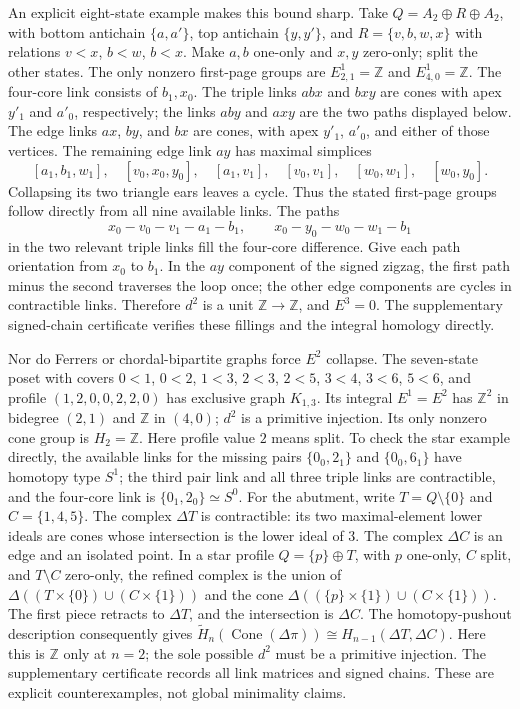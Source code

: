 \documentclass[11pt]{article}
\newcommand{\Cone}{\operatorname{Cone}}
\begin{document}
An explicit eight-state example makes this bound sharp.  Take
$Q=A_2\oplus R\oplus A_2$, with bottom antichain $\{a,a'\}$,
top antichain $\{y,y'\}$, and
$R=\{v,b,w,x\}$ with relations $v<x$, $b<w$, $b<x$.
Make $a,b$ one-only and $x,y$ zero-only; split the other states.
The only nonzero first-page groups are
$E^1_{2,1}=\mathbb Z$ and $E^1_{4,0}=\mathbb Z$.
The four-core link consists of $b_1,x_0$.  The triple links $abx$ and
$bxy$ are cones with apex $y'_1$ and $a'_0$, respectively; the links $aby$
and $axy$ are the two paths displayed below.  The edge links $ax$, $by$,
and $bx$ are cones, with apex $y'_1$, $a'_0$, and either of those vertices.
The remaining edge link $ay$ has maximal simplices
\[
 [a_1,b_1,w_1],\quad[v_0,x_0,y_0],\quad
 [a_1,v_1],\quad[v_0,v_1],\quad[w_0,w_1],\quad[w_0,y_0].
\]
Collapsing its two triangle ears leaves a cycle.  Thus the stated first-page
groups follow directly from all nine available links.  The paths
\[
 x_0-v_0-v_1-a_1-b_1,\qquad
 x_0-y_0-w_0-w_1-b_1
\]
in the two relevant triple links fill the four-core difference.
Give each path orientation from $x_0$ to $b_1$.  In the $ay$ component
of the signed zigzag, the first path minus the second traverses the loop once;
the other edge components are cycles in contractible links.  Therefore
$d^2$ is a unit $\mathbb Z\to\mathbb Z$, and $E^3=0$.
The supplementary signed-chain certificate verifies these fillings and
the integral homology directly.

Nor do Ferrers or chordal-bipartite graphs force $E^2$ collapse.
The seven-state poset with covers
$0<1$, $0<2$, $1<3$, $2<3$, $2<5$, $3<4$, $3<6$, $5<6$,
and profile $(1,2,0,0,2,2,0)$ has exclusive graph $K_{1,3}$.
Its integral $E^1=E^2$ has $\mathbb Z^2$ in bidegree $(2,1)$
and $\mathbb Z$ in $(4,0)$; $d^2$ is a primitive injection.
Its only nonzero cone group is $H_2=\mathbb Z$.
Here profile value $2$ means split.  To check the star example directly,
the available links for the missing pairs $\{0_0,2_1\}$ and
$\{0_0,6_1\}$ have homotopy type $S^1$; the third pair link and all
three triple links are contractible, and the four-core link is
$\{0_1,2_0\}\simeq S^0$.
For the abutment, write $T=Q\setminus\{0\}$ and $C=\{1,4,5\}$.
The complex $\Delta T$ is contractible: its two maximal-element lower ideals
are cones whose intersection is the lower ideal of $3$.
The complex $\Delta C$ is an edge and an isolated point.
In a star profile $Q=\{p\}\oplus T$, with $p$ one-only, $C$ split, and
$T\setminus C$ zero-only, the refined complex is the union of
$\Delta((T\times\{0\})\cup(C\times\{1\}))$ and the cone
$\Delta((\{p\}\times\{1\})\cup(C\times\{1\}))$.
The first piece retracts to $\Delta T$, and the intersection is $\Delta C$.
The homotopy-pushout description consequently gives
$\widetilde H_n(\Cone(\Delta\pi))\cong H_{n-1}(\Delta T,\Delta C)$.
Here this is $\mathbb Z$ only at $n=2$; the sole possible $d^2$ must be a
primitive injection.  The supplementary certificate records all link matrices
and signed chains.  These are explicit counterexamples, not global minimality claims.
\end{document}
